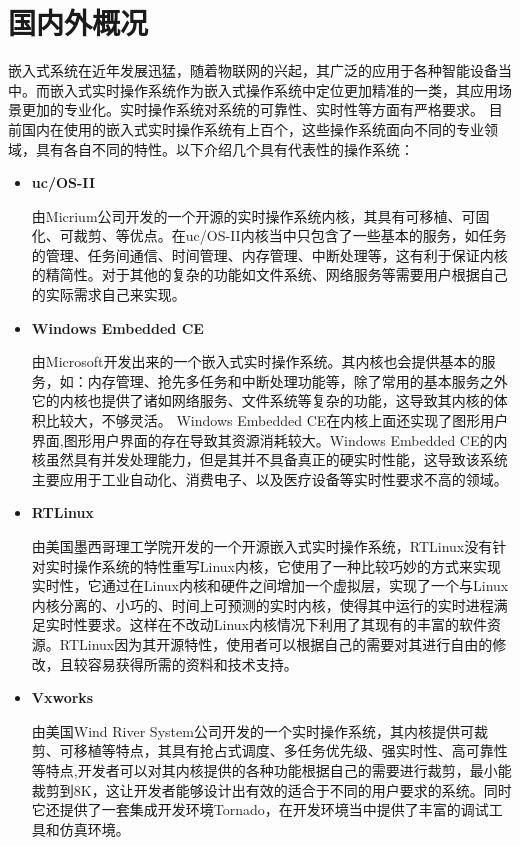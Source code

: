 \section{国内外概况}
	嵌入式系统在近年发展迅猛，随着物联网的兴起，其广泛的应用于各种智能设备当中。而嵌入式实时操作系统作为嵌入式操作系统中定位更加精准的一类，其应用场景更加的专业化\cite{解月江2004VxWorks设备驱动技术研究}\cite{VxWorks嵌入式实时操作系统的结构研究}。实时操作系统对系统的可靠性、实时性等方面有严格要求。
	目前国内在使用的嵌入式实时操作系统有上百个，这些操作系统面向不同的专业领域，具有各自不同的特性。以下介绍几个具有代表性的操作系统：
\begin{itemize}
\item \textbf{uc/OS-II}
	
	由Micrium公司开发的一个开源的实时操作系统内核，其具有可移植、可固化、可裁剪、等优点\cite{Wu2008Implementation}。在uc/OS-II内核当中只包含了一些基本的服务，如任务的管理、任务间通信、时间管理、内存管理、中断处理等\cite{马增炜2011基于}\cite{Zhang2010Design}，这有利于保证内核的精简性。对于其他的复杂的功能如文件系统、网络服务等需要用户根据自己的实际需求自己来实现。
	
	
\item \textbf{Windows Embedded CE}

	由Microsoft开发出来的一个嵌入式实时操作系统。其内核也会提供基本的服务，如：内存管理、抢先多任务和中断处理功能等，除了常用的基本服务之外它的内核也提供了诸如网络服务、文件系统等复杂的功能，这导致其内核的体积比较大，不够灵活。
	Windows Embedded CE在内核上面还实现了图形用户界面,图形用户界面的存在导致其资源消耗较大\cite{徐媛媛2003嵌入式实时操作系统的设备驱动}\cite{谢强2007基于}。Windows Embedded CE的内核虽然具有并发处理能力，但是其并不具备真正的硬实时性能，这导致该系统主要应用于工业自动化、消费电子、以及医疗设备等实时性要求不高的领域。
	
\item \textbf{RTLinux}
	
	由美国墨西哥理工学院开发的一个开源嵌入式实时操作系统，RTLinux没有针对实时操作系统的特性重写Linux内核，它使用了一种比较巧妙的方式来实现实时性，它通过在Linux内核和硬件之间增加一个虚拟层，实现了一个与Linux内核分离的、小巧的、时间上可预测的实时内核，使得其中运行的实时进程满足实时性要求\cite{郭春生2002硬实时操作系统}。这样在不改动Linux内核情况下利用了其现有的丰富的软件资源\cite{Zhu2004RTLinux}。RTLinux因为其开源特性，使用者可以根据自己的需要对其进行自由的修改，且较容易获得所需的资料和技术支持。
	
\item \textbf{Vxworks}

	由美国Wind River System公司开发的一个实时操作系统，其内核提供可裁剪、可移植等特点，其具有抢占式调度、多任务优先级、强实时性、高可靠性等特点\cite{李立志2003实时操作系统}\cite{陈洋2007VxWorks},开发者可以对其内核提供的各种功能根据自己的需要进行裁剪，最小能裁剪到8K，这让开发者能够设计出有效的适合于不同的用户要求的系统\cite{谢强2007基于}\cite{徐媛媛2003嵌入式实时操作系统的设备驱动}。同时它还提供了一套集成开发环境Tornado，在开发环境当中提供了丰富的调试工具和仿真环境。	
\end{itemize}	
		

